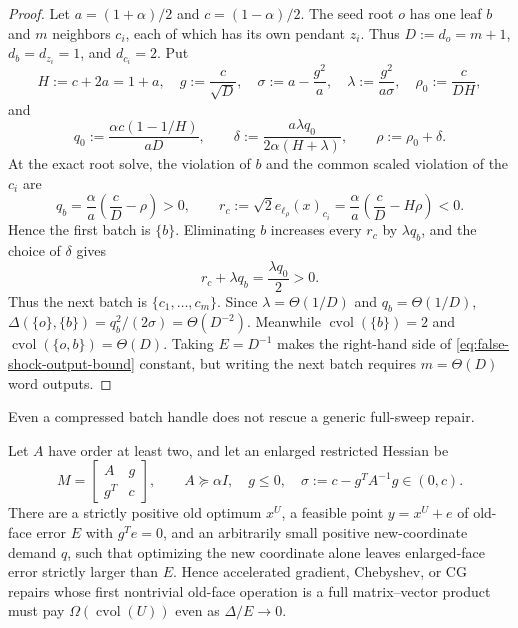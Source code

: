 \begin{proof}
Let $a=(1+\alpha)/2$ and $c=(1-\alpha)/2$.  The seed root $o$ has one leaf
$b$ and $m$ neighbors $c_i$, each of which has its own pendant $z_i$.  Thus
$D:=d_o=m+1$, $d_b=d_{z_i}=1$, and $d_{c_i}=2$.  Put
\begin{equation}
 H:=c+2a=1+a,
 \quad g:=\frac c{\sqrt D},
 \quad \sigma:=a-\frac{g^2}{a},
 \quad \lambda:=\frac{g^2}{a\sigma},
 \quad \rho_0:=\frac c{DH},
 \label{eq:shock-tree-parameters}
\end{equation}
and
\begin{equation}
 q_0:=\frac{\alpha c(1-1/H)}{aD},
 \qquad
 \delta:=\frac{a\lambda q_0}{2\alpha(H+\lambda)},
 \qquad
 \rho:=\rho_0+\delta.
 \label{eq:shock-tree-rho}
\end{equation}
At the exact root solve, the violation of $b$ and the common scaled violation
of the $c_i$ are
\begin{equation}
 q_b=\frac\alpha a\left(\frac cD-\rho\right)>0,
 \qquad
 r_c:=\sqrt2e_{\ell_\rho}(x)_{c_i}
 =\frac\alpha a\left(\frac cD-H\rho\right)<0.
 \label{eq:shock-tree-first-gate}
\end{equation}
Hence the first batch is $\{b\}$.  Eliminating $b$ increases every $r_c$ by
$\lambda q_b$, and the choice of $\delta$ gives
\begin{equation}
 r_c+\lambda q_b=\frac{\lambda q_0}{2}>0.
 \label{eq:shock-tree-second-gate}
\end{equation}
Thus the next batch is $\{c_1,\ldots,c_m\}$.  Since
$\lambda=\Theta(1/D)$ and $q_b=\Theta(1/D)$,
$\Delta(\{o\},\{b\})=q_b^2/(2\sigma)=\Theta(D^{-2})$.
Meanwhile $\operatorname{cvol}(\{b\})=2$ and
$\operatorname{cvol}(\{o,b\})=\Theta(D)$.  Taking $E=D^{-1}$ makes the
right-hand side of \cref{eq:false-shock-output-bound} constant, but writing
the next batch requires $m=\Theta(D)$ word outputs.
\end{proof}

Even a compressed batch handle does not rescue a generic full-sweep repair.

\begin{theorem}
\label{thm:no-full-sweep-shock-repair}
Let $A$ have order at least two, and let an enlarged restricted Hessian be
\begin{equation}
 M=\begin{bmatrix}A&g\\g^T&c\end{bmatrix},
 \qquad A\succeq\alpha I,\quad g\leq0,\quad
 \sigma:=c-g^TA^{-1}g\in(0,c).
 \label{eq:full-sweep-enlargement}
\end{equation}
There are a strictly positive old optimum $x^U$, a feasible point
$y=x^U+e$ of old-face error $E$ with $g^Te=0$, and an arbitrarily small
positive new-coordinate demand $q$, such
that optimizing the new coordinate alone leaves enlarged-face error strictly
larger than $E$.  Hence accelerated gradient, Chebyshev, or CG repairs whose
first nontrivial old-face operation is a full matrix--vector product must pay
$\Omega(\operatorname{cvol}(U))$ even as $\Delta/E\to0$.
\end{theorem}

